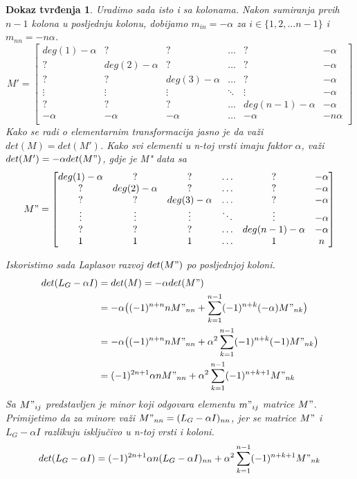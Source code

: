 \documentclass[11pt]{article}
\newtheorem*{custom_proof}{Dokaz tvrđenja}
\begin{document}
\begin{custom_proof}
		Uradimo sada isto i sa kolonama. Nakon sumiranja prvih $n-1$ kolona u posljednju kolonu, dobijamo $m_{in} = -\alpha$ za $i \in \{1,2, \dots n-1\}$ i $m_{nn} = -n \alpha$.
		\[
			M' =\begin{bmatrix}
				deg(1) - \alpha & ? & ? & \dots & ? & -\alpha \\
				? & deg(2) - \alpha & ? & \dots & ? & -\alpha \\
				? & ? & deg(3) - \alpha & \dots & ? & -\alpha \\
				\vdots & \vdots & \vdots & \ddots & \vdots & -\alpha \\
				? & ? & ? & \dots &deg(n-1) - \alpha & -\alpha \\
				-\alpha & -\alpha & -\alpha & \dots &-\alpha & -n \alpha \\
		\end{bmatrix}
		\]
		Kako se radi o elementarnim transformacija jasno je da važi $det(M) = det(M')$.
		Kako svi elementi u n-toj vrsti imaju faktor $\alpha$, važi $det(M')=-\alpha det(M")$, gdje je M" data sa
		\[
			M" =\begin{bmatrix}
				deg(1) - \alpha & ? & ? & \dots & ? & -\alpha \\
				? & deg(2) - \alpha & ? & \dots & ? & -\alpha \\
				? & ? & deg(3) - \alpha & \dots & ? & -\alpha \\
				\vdots & \vdots & \vdots & \ddots & \vdots & -\alpha \\
				? & ? & ? & \dots &deg(n-1) - \alpha & -\alpha \\
				1 & 1 & 1 & \dots & 1 & n \\
				\end{bmatrix}
		\]

		Iskoristimo sada Laplasov razvoj $det(M")$ po posljednjoj koloni.
		\[ 
		\begin{split}
			det(L_G - \alpha I) & = det(M) = -\alpha det(M") \\
			                    & = -\alpha \big( (-1)^{n+n}nM"_{nn} + \sum_{k=1}^{n-1}(-1)^{n+k}(-\alpha) M"_{nk} \big)  \\
			                    & = -\alpha \big( (-1)^{n+n}nM"_{nn} + \alpha^2 \sum_{k=1}^{n-1}(-1)^{n+k}(-1)M"_{nk} \big) \\
					     	    & = (-1)^{2n+1} \alpha nM"_{nn} + \alpha^2 \sum_{k=1}^{n-1}(-1)^{n+k+1}M"_{nk}
		\end{split}
		\]
		Sa $M"_{ij}$ predstavljen je minor koji odgovara elementu $m"_{ij}$ matrice $M"$.
		Primijetimo da za minore važi $M"_{nn} = (L_G - \alpha I)_{nn}$, jer se matrice  $M"$ i $L_G - \alpha I$ razlikuju isključivo u n-toj vrsti i koloni.
		\[
		det(L_G - \alpha I) = (-1)^{2n+1} \alpha n (L_G- \alpha I)_{nn} + \alpha^2 \sum_{k=1}^{n-1}(-1)^{n+k+1}M"_{nk}
		\]
		

\end{custom_proof}
\end{document}
